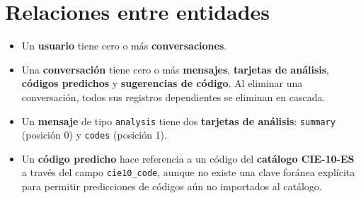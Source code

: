 \section{Relaciones entre entidades}

\begin{itemize}
    \item Un \textbf{usuario} tiene cero o más \textbf{conversaciones}.
    \item Una \textbf{conversación} tiene cero o más \textbf{mensajes}, \textbf{tarjetas de análisis}, \textbf{códigos predichos} y \textbf{sugerencias de código}. Al eliminar una conversación, todos sus registros dependientes se eliminan en cascada.
    \item Un \textbf{mensaje} de tipo \texttt{analysis} tiene dos \textbf{tarjetas de análisis}: \texttt{summary} (posición 0) y \texttt{codes} (posición 1).
    \item Un \textbf{código predicho} hace referencia a un código del \textbf{catálogo CIE-10-ES} a través del campo \texttt{cie10\_code}, aunque no existe una clave foránea explícita para permitir predicciones de códigos aún no importados al catálogo.
\end{itemize}
